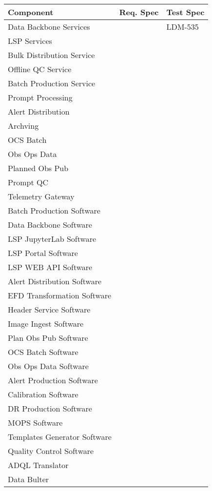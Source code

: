 {\small
\begin{longtable}[]{p{5cm}|p{3cm}|p{3cm}}\hline
{\bf Component} & {\bf Req. Spec} & {\bf Test Spec} \\ \hline
Data Backbone Services & & \cellcolor{pastelyellow} LDM-535 \\\hline
LSP Services& & \\\hline
Bulk Distribution Service & & \\\hline
Offline QC Service & & \\\hline
Batch Production Service & & \\\hline
Prompt Processing  & & \\\hline
Alert Distribution & & \\\hline
Archving & & \\\hline
OCS Batch & & \\\hline
Obs Ops Data & & \\\hline
Planned Obs Pub & & \\\hline
Prompt QC & & \\\hline
Telemetry Gateway & & \\\hline
Batch Production Software & & \\\hline
Data Backbone Software & & \\\hline
LSP JupyterLab Software & & \\\hline
LSP Portal Software & & \\\hline
LSP WEB API Software & & \\\hline
Alert Distribution Software & & \\\hline
EFD Transformation Software & & \\\hline
Header Service Software & & \\\hline
Image Ingest Software & & \\\hline
Plan Obs Pub Software & & \\\hline
OCS Batch Software & & \\\hline
Obs Ops Data Software & & \\\hline
Alert Production Software & & \\\hline
Calibration Software & & \\\hline
DR Production Software & & \\\hline
MOPS Software & & \\\hline
Templates Generator Software & & \\\hline
Quality Control Software & & \\\hline
ADQL Translator & & \\\hline
Data Bulter & & \\\hline

\end{longtable}}
